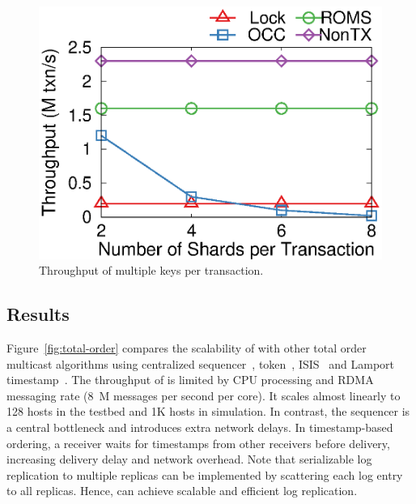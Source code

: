 \begin{figure}[t!]
\begin{minipage}{.31\textwidth}
		\centering
		\includegraphics[width=\textwidth]{gnuplot/multishard.eps}
		\caption{Throughput of multiple keys per transaction.}
		\label{fig:multishard}
    \end{minipage}
\end{figure}

\subsection{Results}
\label{subsubsec:scalability}
Figure~\ref{fig:total-order} compares the scalability of \sys with other total order multicast algorithms using centralized sequencer~\cite{eris,kaminsky2016design}, token~\cite{rajagopalan1989token}, ISIS~\cite{birman1985replication} and Lamport timestamp~\cite{lamport1978time}. The throughput of \sys is limited by CPU processing and RDMA messaging rate (8~M messages per second per core).
It scales almost linearly to 128 hosts in the testbed and 1K hosts in simulation. In contrast, the sequencer is a central bottleneck and introduces extra network delays. In timestamp-based ordering, a receiver waits for timestamps from other receivers before delivery, increasing delivery delay and network overhead. Note that serializable log replication to multiple replicas can be implemented by scattering each log entry to all replicas. Hence, \sys can achieve scalable and efficient log replication.







